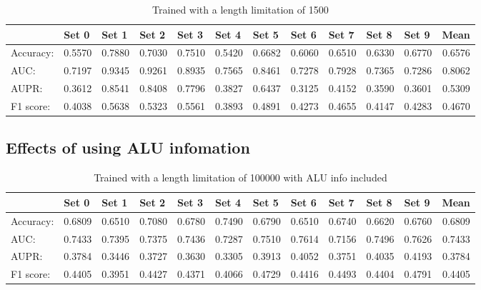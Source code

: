 \documentclass[10pt,a4paper]{article}
\begin{document}
\begin{spacing}{1.5}
\begin{table}[H]
	\centering
	\caption{Trained with a length limitation of 1500}
	\begin{tabular}{l|rrrrrrrrrr|r}
		& \multicolumn{1}{l}{Set 0} & \multicolumn{1}{l}{Set 1} & \multicolumn{1}{l}{Set 2} & \multicolumn{1}{l}{Set 3} & \multicolumn{1}{l}{Set 4} & \multicolumn{1}{l}{Set 5} & \multicolumn{1}{l}{Set 6} & \multicolumn{1}{l}{Set 7} & \multicolumn{1}{l}{Set 8} & \multicolumn{1}{l}{Set 9} & \multicolumn{1}{l}{Mean} \\ \hline \hline
		Accuracy: & 0.5570  & 0.7880  & 0.7030  & 0.7510  & 0.5420  & 0.6682  & 0.6060  & 0.6510  & 0.6330  & 0.6770  & 0.6576  \\
		AUC:  & 0.7197  & 0.9345  & 0.9261  & 0.8935  & 0.7565  & 0.8461  & 0.7278  & 0.7928  & 0.7365  & 0.7286  & 0.8062  \\
		AUPR: & 0.3612  & 0.8541  & 0.8408  & 0.7796  & 0.3827  & 0.6437  & 0.3125  & 0.4152  & 0.3590  & 0.3601  & 0.5309  \\
		F1 score: & 0.4038  & 0.5638  & 0.5323  & 0.5561  & 0.3893  & 0.4891  & 0.4273  & 0.4655  & 0.4147  & 0.4283  & 0.4670  \\
	\end{tabular}%
	\label{tab:addlabel}%
\end{table}%

\subsection{Effects of using ALU infomation}

\begin{table}[H]
	\centering
	\caption{Trained with a length limitation of 100000 with ALU info included}
	\begin{tabular}{l|rrrrrrrrrr|r}
		& \multicolumn{1}{l}{Set 0} & \multicolumn{1}{l}{Set 1} & \multicolumn{1}{l}{Set 2} & \multicolumn{1}{l}{Set 3} & \multicolumn{1}{l}{Set 4} & \multicolumn{1}{l}{Set 5} & \multicolumn{1}{l}{Set 6} & \multicolumn{1}{l}{Set 7} & \multicolumn{1}{l}{Set 8} & \multicolumn{1}{l}{Set 9} & \multicolumn{1}{l}{Mean} \\ \hline \hline
		Accuracy: & 0.6809  & 0.6510  & 0.7080  & 0.6780  & 0.7490  & 0.6790  & 0.6510  & 0.6740  & 0.6620  & 0.6760  & 0.6809  \\
		AUC:  & 0.7433  & 0.7395  & 0.7375  & 0.7436  & 0.7287  & 0.7510  & 0.7614  & 0.7156  & 0.7496  & 0.7626  & 0.7433  \\
		AUPR: & 0.3784  & 0.3446  & 0.3727  & 0.3630  & 0.3305  & 0.3913  & 0.4052  & 0.3751  & 0.4035  & 0.4193  & 0.3784  \\
		F1 score: & 0.4405  & 0.3951  & 0.4427  & 0.4371  & 0.4066  & 0.4729  & 0.4416  & 0.4493  & 0.4404  & 0.4791  & 0.4405  \\
	\end{tabular}%
	\label{tab:addlabel}%
\end{table}%



\end{spacing}
\end{document}
